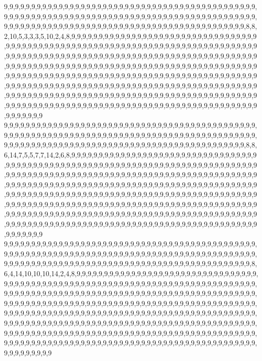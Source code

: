9,9,9,9,9,9,9,9,9,9,9,9,9,9,9,9,9,9,9,9,9,9,9,9,9,9,9,9,9,9,9,9,9,9,9,9,9,9,9,9,9,9,9,9,9,9,9,9,9,9,9,9,9,9,9,9,9,9,9,9,9,9,9,9,9,9,9,9,9,9,9,9,9,9,9,9,9,9,9,9,9,9,9,9,9,9,9,9,9,9,9,9,9,9,9,9,9,9,9,9,9,9,9,9,9,9,9,9,9,9,9,9,9,9,9,9,9,9,9,9,9,9,9,9,9,9,9,9,9,9,9,9,9,9,9,9,8,8,2,10,5,3,3,3,5,10,2,4,8,9,9,9,9,9,9,9,9,9,9,9,9,9,9,9,9,9,9,9,9,9,9,9,9,9,9,9,9,9,9,9,9,9,9,9,9,9,9,9,9,9,9,9,9,9,9,9,9,9,9,9,9,9,9,9,9,9,9,9,9,9,9,9,9,9,9,9,9,9,9,9,9,9,9,9,9,9,9,9,9,9,9,9,9,9,9,9,9,9,9,9,9,9,9,9,9,9,9,9,9,9,9,9,9,9,9,9,9,9,9,9,9,9,9,9,9,9,9,9,9,9,9,9,9,9,9,9,9,9,9,9,9,9,9,9,9,9,9,9,9,9,9,9,9,9,9,9,9,9,9,9,9,9,9,9,9,9,9,9,9,9,9,9,9,9,9,9,9,9,9,9,9,9,9,9,9,9,9,9,9,9,9,9,9,9,9,9,9,9,9,9,9,9,9,9,9,9,9,9,9,9,9,9,9,9,9,9,9,9,9,9,9,9,9,9,9,9,9,9,9,9,9,9,9,9,9,9,9,9,9,9,9,9,9,9,9,9,9,9,9,9,9,9,9,9,9,9,9,9,9,9,9,9,9,9,9,9,9,9,9,9,9,9,9,9,9,9,9,9,9,9,9,9,9,9,9,9,9,9,9,9,9,9,9,9,9,9,9,9,9,9,9,9,9,9,9,9,9,9,9,9,9,9,9,9,9,9,9,9,9,9,9,9,9,9,9,9,9,9,9,9,9,9,9,9,9,9,9,9,9,9,9,9,9,9,9,9,9,9,9,9,9,9,9,9,9,9,9,9,9,9,9,9,9,9,9,9,9,9,9,9,9,9
9,9,9,9,9,9,9,9,9,9,9,9,9,9,9,9,9,9,9,9,9,9,9,9,9,9,9,9,9,9,9,9,9,9,9,9,9,9,9,9,9,9,9,9,9,9,9,9,9,9,9,9,9,9,9,9,9,9,9,9,9,9,9,9,9,9,9,9,9,9,9,9,9,9,9,9,9,9,9,9,9,9,9,9,9,9,9,9,9,9,9,9,9,9,9,9,9,9,9,9,9,9,9,9,9,9,9,9,9,9,9,9,9,9,9,9,9,9,9,9,9,9,9,9,9,9,9,9,9,9,9,9,9,9,9,9,8,8,6,14,7,5,5,7,7,14,2,6,8,9,9,9,9,9,9,9,9,9,9,9,9,9,9,9,9,9,9,9,9,9,9,9,9,9,9,9,9,9,9,9,9,9,9,9,9,9,9,9,9,9,9,9,9,9,9,9,9,9,9,9,9,9,9,9,9,9,9,9,9,9,9,9,9,9,9,9,9,9,9,9,9,9,9,9,9,9,9,9,9,9,9,9,9,9,9,9,9,9,9,9,9,9,9,9,9,9,9,9,9,9,9,9,9,9,9,9,9,9,9,9,9,9,9,9,9,9,9,9,9,9,9,9,9,9,9,9,9,9,9,9,9,9,9,9,9,9,9,9,9,9,9,9,9,9,9,9,9,9,9,9,9,9,9,9,9,9,9,9,9,9,9,9,9,9,9,9,9,9,9,9,9,9,9,9,9,9,9,9,9,9,9,9,9,9,9,9,9,9,9,9,9,9,9,9,9,9,9,9,9,9,9,9,9,9,9,9,9,9,9,9,9,9,9,9,9,9,9,9,9,9,9,9,9,9,9,9,9,9,9,9,9,9,9,9,9,9,9,9,9,9,9,9,9,9,9,9,9,9,9,9,9,9,9,9,9,9,9,9,9,9,9,9,9,9,9,9,9,9,9,9,9,9,9,9,9,9,9,9,9,9,9,9,9,9,9,9,9,9,9,9,9,9,9,9,9,9,9,9,9,9,9,9,9,9,9,9,9,9,9,9,9,9,9,9,9,9,9,9,9,9,9,9,9,9,9,9,9,9,9,9,9,9,9,9,9,9,9,9,9,9,9,9,9,9,9,9,9,9,9,9,9,9,9,9,9,9,9,9,9,9,9,9
9,9,9,9,9,9,9,9,9,9,9,9,9,9,9,9,9,9,9,9,9,9,9,9,9,9,9,9,9,9,9,9,9,9,9,9,9,9,9,9,9,9,9,9,9,9,9,9,9,9,9,9,9,9,9,9,9,9,9,9,9,9,9,9,9,9,9,9,9,9,9,9,9,9,9,9,9,9,9,9,9,9,9,9,9,9,9,9,9,9,9,9,9,9,9,9,9,9,9,9,9,9,9,9,9,9,9,9,9,9,9,9,9,9,9,9,9,9,9,9,9,9,9,9,9,9,9,9,9,9,9,9,9,9,9,9,9,8,6,4,14,10,10,10,14,2,4,8,9,9,9,9,9,9,9,9,9,9,9,9,9,9,9,9,9,9,9,9,9,9,9,9,9,9,9,9,9,9,9,9,9,9,9,9,9,9,9,9,9,9,9,9,9,9,9,9,9,9,9,9,9,9,9,9,9,9,9,9,9,9,9,9,9,9,9,9,9,9,9,9,9,9,9,9,9,9,9,9,9,9,9,9,9,9,9,9,9,9,9,9,9,9,9,9,9,9,9,9,9,9,9,9,9,9,9,9,9,9,9,9,9,9,9,9,9,9,9,9,9,9,9,9,9,9,9,9,9,9,9,9,9,9,9,9,9,9,9,9,9,9,9,9,9,9,9,9,9,9,9,9,9,9,9,9,9,9,9,9,9,9,9,9,9,9,9,9,9,9,9,9,9,9,9,9,9,9,9,9,9,9,9,9,9,9,9,9,9,9,9,9,9,9,9,9,9,9,9,9,9,9,9,9,9,9,9,9,9,9,9,9,9,9,9,9,9,9,9,9,9,9,9,9,9,9,9,9,9,9,9,9,9,9,9,9,9,9,9,9,9,9,9,9,9,9,9,9,9,9,9,9,9,9,9,9,9,9,9,9,9,9,9,9,9,9,9,9,9,9,9,9,9,9,9,9,9,9,9,9,9,9,9,9,9,9,9,9,9,9,9,9,9,9,9,9,9,9,9,9,9,9,9,9,9,9,9,9,9,9,9,9,9,9,9,9,9,9,9,9,9,9,9,9,9,9,9,9,9,9,9,9,9,9,9,9,9,9,9,9,9,9,9,9,9,9,9,9,9,9,9,9,9,9,9,9,9,9,9,9,9,9,9,9

